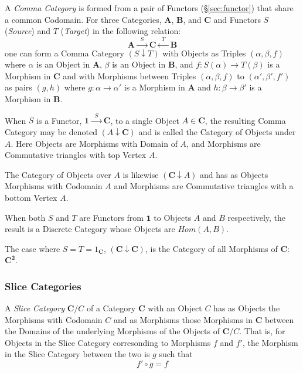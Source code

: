 A \emph{Comma Category} is formed from a pair of Functors
(\S\ref{sec:functor}) that share a common Codomain. For three
Categories, $\mathbf{A}$, $\mathbf{B}$, and $\mathbf{C}$ and Functors
$S$ (\emph{Source}) and $T$ (\emph{Target}) in the following relation:
\[
    \mathbf{A} \xrightarrow{\;\; S\;\;} \mathbf{C} \xleftarrow{\;\;
      T\;\;} \mathbf{B}
\]
one can form a Comma Category $(S \downarrow T)$ with Objects as
Triples $(\alpha, \beta, f)$ where $\alpha$ is an Object in
$\mathbf{A}$, $\beta$ is an Object in $\mathbf{B}$, and $f : S(\alpha)
\rightarrow T(\beta)$ is a Morphism in $\mathbf{C}$ and with Morphisms
between Triples $(\alpha, \beta, f)$ to $(\alpha', \beta', f')$ as
pairs $(g,h)$ where $g : \alpha \rightarrow \alpha'$ is a Morphism in
$\mathbf{A}$ and $h : \beta \rightarrow \beta'$ is a Morphism in
$\mathbf{B}$.

When $S$ is a Functor, $\mathbf{1} \xrightarrow{\;\;S\;\;}
\mathbf{C}$, to a single Object $A \in \mathbf{C}$, the resulting
Comma Category may be denoted $(A \downarrow \mathbf{C})$ and is
called the Category of Objects under $A$. Here Objects are Morphisms
with Domain of $A$, and Morphisms are Commutative triangles with top
Vertex $A$.

The Category of Objects over $A$ is likewise $(\mathbf{C} \downarrow
A)$ and has as Objects Morphisms with Codomain $A$ and Morphisms are
Commutative triangles with a bottom Vertex $A$.

When both $S$ and $T$ are Functors from $\mathbf{1}$ to Objects $A$
and $B$ respectively, the result is a Discrete Category whose Objects
are $Hom(A,B)$.

The case where $S = T = 1_\mathbf{C}$, $(\mathbf{C} \downarrow
\mathbf{C})$, is the Category of all Morphisms of $\mathbf{C}$:
$\mathbf{C}^\mathbf{2}$.



\subsubsection{Slice Categories}\label{sec:slice_categories}

A \emph{Slice Category} $\mathbf{C}/C$ of a Category $\mathbf{C}$ with
an Object $C$ has as Objects the Morphisms with Codomain $C$ and as
Morphisms those Morphisms in $\mathbf{C}$ between the Domains of the
underlying Morphisms of the Objects of $\mathbf{C}/C$. That is, for
Objects in the Slice Category corresonding to Morphisms $f$ and $f'$,
the Morphism in the Slice Category between the two is $g$ such that
\[
    f' \circ g = f
\]

